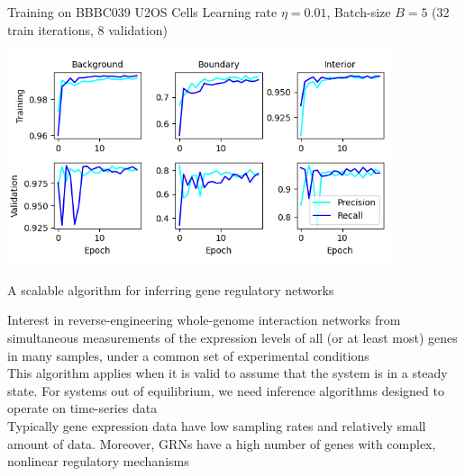 \documentclass[aspectratio=1610]{beamer}					%
\begin{document}
\begin{frame}{Training on BBBC039 U2OS Cells}
Learning rate $\eta=0.01$, Batch-size $B=5$ (32 train iterations, 8 validation)
\begin{center}
\includegraphics[width=0.85\textwidth]{metrics.png}
\end{center}

\end{frame}


\begin{frame}{A scalable algorithm for inferring gene regulatory networks}

Interest in reverse-engineering whole-genome interaction networks from simultaneous measurements of the
expression levels of all (or at least most) genes in many
samples, under a common set of experimental conditions\\
\vspace{0.2in}
This algorithm applies when it is valid to assume that the system is in a steady state. For systems out of equilibrium, we need inference algorithms designed to operate on time-series data\\
\vspace{0.2in}
Typically gene expression data have low sampling rates and relatively small
amount of data. Moreover, GRNs have a high number of genes
with complex, nonlinear regulatory mechanisms

\end{frame}
\end{document}
